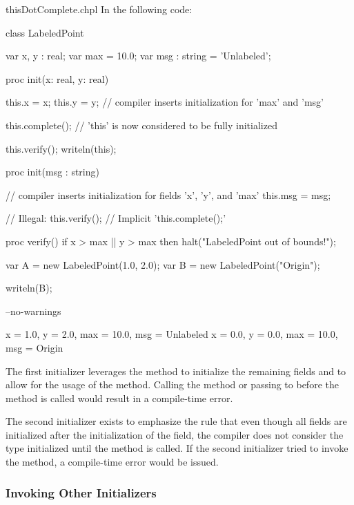 \begin{chapelexample}{thisDotComplete.chpl}
In the following code:
\begin{chapel}
class LabeledPoint {
  var x, y : real;
  var max = 10.0;
  var msg : string = 'Unlabeled';

  proc init(x: real, y: real) {
    this.x = x;
    this.y = y;
    // compiler inserts initialization for 'max' and 'msg'

    this.complete(); // 'this' is now considered to be fully initialized

    this.verify();
    writeln(this);
  }

  proc init(msg : string) {
    // compiler inserts initialization for fields 'x', 'y', and 'max'
    this.msg = msg;

    // Illegal: this.verify();
    // Implicit 'this.complete();'
  }

  proc verify() {
    if x > max || y > max then
      halt("LabeledPoint out of bounds!");
  }
}

var A = new LabeledPoint(1.0, 2.0);
var B = new LabeledPoint("Origin");
\end{chapel}
\begin{chapelpost}
writeln(B);
\end{chapelpost}
\begin{chapelcompopts}
--no-warnings
\end{chapelcompopts}
\begin{chapeloutput}
{x = 1.0, y = 2.0, max = 10.0, msg = Unlabeled}
{x = 0.0, y = 0.0, max = 10.0, msg = Origin}
\end{chapeloutput}

The first initializer leverages the  method to initialize the
remaining fields and to allow for the usage of the  method.
Calling the  method or passing  to 
before the  method is called would result in a compile-time
error.

The second initializer exists to emphasize the rule that even though all
fields are initialized after the initialization of the  field, the
compiler does not consider the type initialized until the 
method is called. If the second initializer tried to invoke the 
method, a compile-time error would be issued.
\end{chapelexample}

\subsubsection{Invoking Other Initializers}
\label{Invoking_Other_Initializers}

